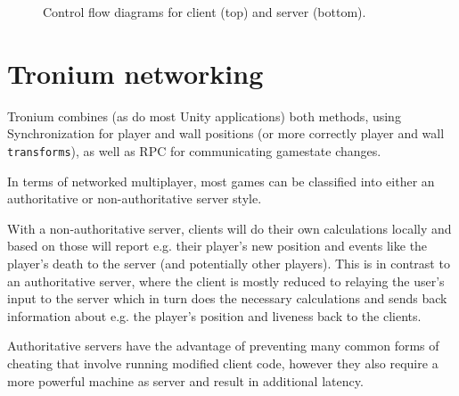 \documentclass{report}
\newcommand{\cs}[1]{\texttt{\penalty 100 #1}}
\begin{document}
\begin{figure}[bp]
{
}
\caption{Control flow diagrams for client (top) and server (bottom).}
\end{figure}

\section{Tronium networking}
Tronium combines (as do most Unity applications) both methods, using Synchronization for player and wall positions (or more correctly player and wall \cs{transforms}), as well as RPC for communicating gamestate changes.

In terms of networked multiplayer, most games can be classified into either an authoritative or non-authoritative server style.

With a non-authoritative server, clients will do their own calculations locally and based on those will report e.g. their player's new position and events like the player's death to the server (and potentially other players). This is in contrast to an authoritative server, where the client is mostly reduced to relaying the user's input to the server which in turn does the necessary calculations and sends back information about   e.g. the player's position and liveness back to the clients.

Authoritative servers have the advantage of preventing many common forms of cheating that involve running modified client code, however they also require a more powerful machine as server and result in additional latency.
\end{document}
